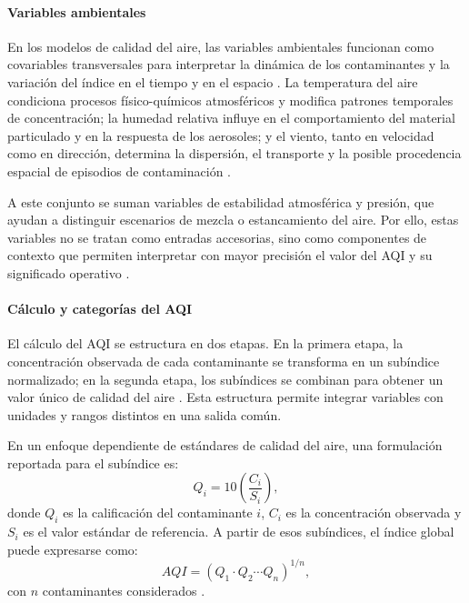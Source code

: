 \paragraph{Variables ambientales}
En los modelos de calidad del aire, las variables ambientales funcionan como covariables transversales para interpretar la dinámica de los contaminantes y la variación del índice en el tiempo y en el espacio \cite{ART01,ART02}. La temperatura del aire condiciona procesos físico-químicos atmosféricos y modifica patrones temporales de concentración; la humedad relativa influye en el comportamiento del material particulado y en la respuesta de los aerosoles; y el viento, tanto en velocidad como en dirección, determina la dispersión, el transporte y la posible procedencia espacial de episodios de contaminación \cite{ART01,ART02}.

A este conjunto se suman variables de estabilidad atmosférica y presión, que ayudan a distinguir escenarios de mezcla o estancamiento del aire. Por ello, estas variables no se tratan como entradas accesorias, sino como componentes de contexto que permiten interpretar con mayor precisión el valor del AQI y su significado operativo \cite{ART01,ART02}.

\paragraph{Cálculo y categorías del AQI}
El cálculo del AQI se estructura en dos etapas. En la primera etapa, la concentración observada de cada contaminante se transforma en un subíndice normalizado; en la segunda etapa, los subíndices se combinan para obtener un valor único de calidad del aire \cite{ART01,ART02}. Esta estructura permite integrar variables con unidades y rangos distintos en una salida común.

En un enfoque dependiente de estándares de calidad del aire, una formulación reportada para el subíndice es:
\begin{equation}
Q_i = 10\left(\frac{C_i}{S_i}\right),
\end{equation}
donde \(Q_i\) es la calificación del contaminante \(i\), \(C_i\) es la concentración observada y \(S_i\) es el valor estándar de referencia. A partir de esos subíndices, el índice global puede expresarse como:
\begin{equation}
AQI=\left(Q_1\cdot Q_2\cdots Q_n\right)^{1/n},
\end{equation}
con \(n\) contaminantes considerados \cite{ART02}.

